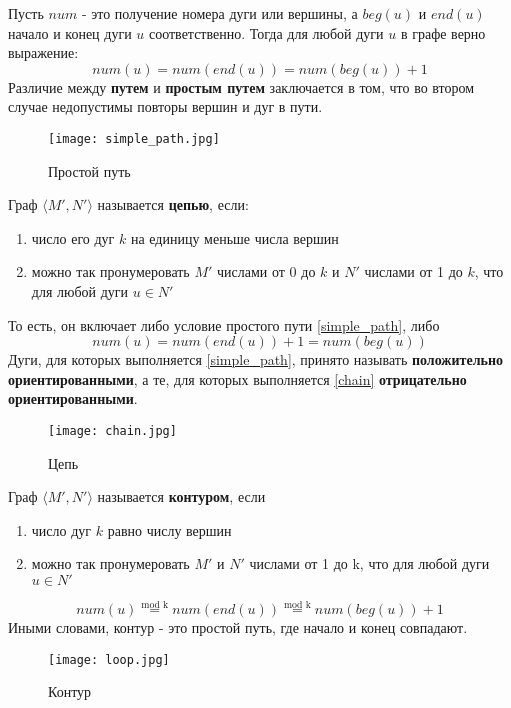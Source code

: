 Пусть $num$ - это получение номера дуги или вершины, а $beg(u)$ и $end(u)$ начало и конец дуги 
$u$ соответственно. Тогда для любой дуги $u$ в графе верно выражение:
\begin{equation}
    \label{simple_path}
    num(u) = num(end(u)) = num(beg(u)) + 1
\end{equation}
Различие между \textbf{путем} и \textbf{простым путем} заключается в том, что во втором случае
недопустимы повторы вершин и дуг в пути.
\begin{figure}[h]
    \centering 
    \texttt{[image: simple\_path.jpg]}
    \caption{Простой путь}
\end{figure}

Граф $\langle M', N'\rangle$ называется \textbf{цепью}, если:
\begin{enumerate}
    \item число его дуг $k$ на единицу меньше числа вершин
    \item можно так пронумеровать $M'$ числами от 0 до $k$ и $N'$ числами от 1 до $k$,
    что для любой дуги $u \in N'$
\end{enumerate}
То есть, он включает либо условие простого пути \ref{simple_path}, либо
\begin{equation}
    \label{chain}
    num(u) = num(end(u)) + 1 = num(beg(u))
\end{equation}
Дуги, для которых выполняется \ref{simple_path}, принято называть \textbf{положительно ориентированными},
а те, для которых выполняется \ref{chain} \textbf{отрицательно ориентированными}.

\begin{figure}[h]
    \centering 
    \texttt{[image: chain.jpg]}
    \caption{Цепь}
\end{figure}

Граф $\langle M', N'\rangle$ называется \textbf{контуром}, если
\begin{enumerate}
    \item число дуг $k$ равно числу вершин
    \item можно так пронумеровать $M'$ и $N'$ числами от 1 до k, что для любой
    дуги $u \in N'$
\end{enumerate}
\begin{equation}
    num(u) \stackrel{\text{mod k}}{=} num(end(u)) \stackrel{\text{mod k}}{=} num(beg(u)) + 1
\end{equation}
Иными словами, контур - это простой путь, где начало и конец совпадают.

\begin{figure}[h]
    \centering 
    \texttt{[image: loop.jpg]}
    \caption{Контур}
\end{figure}

